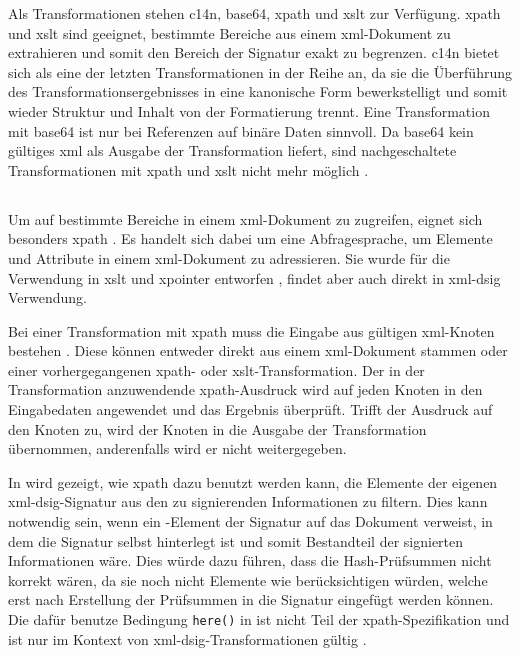 Als Transformationen stehen \gls{c14n}, \gls{base64}, \gls{xpath} und \gls{xslt} zur Verfügung. \gls{xpath} und \gls{xslt} sind geeignet, bestimmte Bereiche aus
einem \gls{xml}-Dokument zu extrahieren und somit den Bereich der Signatur exakt zu begrenzen. \gls{c14n} bietet sich als eine der letzten
Transformationen in der Reihe an, da sie die Überführung des Transformationsergebnisses in eine kanonische Form bewerkstelligt und somit wieder Struktur und
Inhalt von der Formatierung trennt. Eine Transformation mit \gls{base64} ist nur bei Referenzen auf binäre Daten sinnvoll. Da \gls{base64} kein gültiges
\gls{xml} als Ausgabe der Transformation liefert, sind nachgeschaltete Transformationen mit \gls{xpath} und \gls{xslt} nicht mehr möglich \cite{xml-dsig:w3c}.

\subsection{}
\label{sec:XML-DSig:Transformationen:XPath}
Um auf bestimmte Bereiche in einem \gls{xml}-Dokument zu zugreifen, eignet sich besonders \gls{xpath} \cite{xml:oreilly}. Es handelt sich dabei um eine
Abfragesprache, um Elemente und Attribute in einem \gls{xml}-Dokument zu adressieren. Sie wurde für die Verwendung in \gls{xslt} und \gls{xpointer} entworfen
\cite{xpath:w3c}, findet aber auch direkt in \gls{xml-dsig} Verwendung.

Bei einer Transformation mit \gls{xpath} muss die Eingabe aus gültigen \gls{xml}-Knoten bestehen \cite{xml-dsig:w3c}. Diese können entweder direkt aus einem
\gls{xml}-Dokument stammen oder einer vorhergegangenen \gls{xpath}- oder \gls{xslt}-Transformation. Der in der Transformation anzuwendende \gls{xpath}-Ausdruck
wird auf jeden Knoten in den Eingabedaten angewendet und das Ergebnis überprüft. Trifft der Ausdruck auf den Knoten zu, wird der Knoten in die Ausgabe der
Transformation übernommen, anderenfalls wird er nicht weitergegeben.

In  wird gezeigt, wie \gls{xpath} dazu benutzt werden kann, die Elemente der eigenen \gls{xml-dsig}-Signatur aus den zu
signierenden Informationen zu filtern. Dies kann notwendig sein, wenn ein -Element der Signatur auf das Dokument verweist, in dem die
Signatur selbst hinterlegt ist und somit Bestandteil der signierten Informationen wäre. Dies würde dazu führen, dass die Hash-Prüfsummen nicht korrekt wären, da
sie noch nicht Elemente wie  berücksichtigen würden, welche erst nach Erstellung der Prüfsummen in die Signatur eingefügt werden können.
Die dafür benutze Bedingung \texttt{here()} in  ist nicht Teil der \gls{xpath}-Spezifikation und ist nur im Kontext
von \gls{xml-dsig}-Transformationen gültig \cite{xml-dsig:w3c}.

